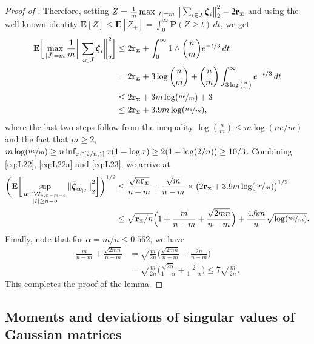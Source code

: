 \documentclass[aos,preprint,reqno]{imsart}
\newcommand\bzeta{\boldsymbol\zeta}
\newcommand\bSigma{\boldsymbol\Sigma}
\newcommand\bfE{\mathbf E}
\newcommand\bfP{\mathbf P}
\newcommand\bw{\boldsymbol w}
\newcommand\rSigma{\textbf{\textup{r}}_{\scriptscriptstyle\bSigma}}
\theoremstyle{plain}
\theoremstyle{remark}
\begin{document}
\begin{proof}[Proof of ]
	Therefore, setting $Z =\frac1m\max_{|J| = m}  \big\|\sum_{i\in J} 
	\bzeta_i\big\|^2_2 - 2\rSigma$ and using the well-known 
	identity $\bfE[Z] \le \bfE[Z_+] = \int_0^\infty
	\bfP(Z\ge t)\,dt$, we get 
	\begin{align}
			\bfE\bigg[\max_{|\bar J| = m} \frac1{m} \bigg\|
			\sum_{i\in\bar J} \bzeta_i\bigg\|^2_2\bigg] 
			&\le 2\rSigma + \int_0^\infty 
					1\wedge {{n}\choose{m}} e^{-t/3}\,dt\\
			&= 2\rSigma + 3 \log {{n}\choose{m}}
					+ {{n}\choose{m}}\int_{3\log {{n}\choose{m}}}^\infty 
					e^{-t/3}\,dt\\
			& \le 2\rSigma + 3m\log(\nicefrac{ne}{m}) + 3\\
			& \le 2\rSigma + 3.9m\log(\nicefrac{ne}{m}), \label{eq:L23}
	\end{align}
	where the last two steps follow from the inequality $\log {n\choose{m}}
	\le m\log (ne/m)$ and the fact that $m\ge 2$, $m\log(\nicefrac{ne}{m}) \ge 
	n \inf_{x\in [2/n,1]} x(1-\log x) \ge 2(1-\log (2/n))\ge 10/3$. Combining 
	\eqref{eq:L22}, \eqref{eq:L22a} and \eqref{eq:L23}, we arrive at 
	\begin{align}
			\bigg(\bfE\bigg[\sup_{\substack{\bw\in \mathcal W_{n,n-m+o} 
					\\ |I| \ge n-o}}
			{\|\bar{\bzeta}_{\bw_{|I}}\|}_2^2\bigg]\bigg)^{1/2} 
			&\le \frac{\sqrt{n\rSigma}}{n-m} + \frac{\sqrt{m}}{
			n-m}\times\big(2\rSigma + 3.9m 
			\log(\nicefrac{ne}{m})\big)^{1/2}\\
			&\le \sqrt{\rSigma/n}\Big(1+ \frac{m}{n-m} + \frac{\sqrt{2mn}}{n-m}\Big) 
			+ \frac{4.6m}{n}\sqrt{\log(\nicefrac{ne}{m})}.
	\end{align}
	Finally, note that for $\alpha = m/n\le 0.562$, we have
	\begin{align}
	\frac{m}{n-m} + \frac{\sqrt{2mn}}{n-m} &= \sqrt{\frac{m}{2n}}\bigg(
			\frac{\sqrt{2mn}}{n-m} + \frac{2n}{n-m}\bigg)\\
			& = \sqrt{\frac{m}{2n}}\bigg(
			\frac{\sqrt{2\alpha}}{1-\alpha} + \frac{2}{1-\alpha}\bigg)
			\le 7\sqrt{\frac{m}{2n}}.
	\end{align}
	This completes the proof of the lemma.
	\end{proof}




	\subsection{Moments and deviations of singular values of Gaussian matrices}
\end{document}
